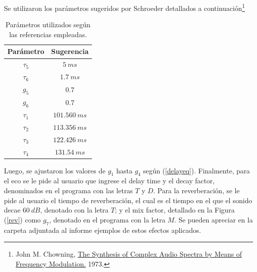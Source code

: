 Se utilizaron los parámetros sugeridos por Schroeder detallados a continuación\footnote{John M. Chowning, \href{https://ccrma.stanford.edu/sites/default/files/user/jc/fm_synthesispaper-2.pdf}{The Synthesis of Complex Audio Spectra by Means of Frequency Modulation.} 1973.}

\begin{table}[H]
\centering
\begin{tabular}{@{}cc@{}}
\toprule
Parámetro & Sugerencia \\ \midrule
$\tau_5$ & $5 \ ms$ \\
$\tau_6$ & $1.7 \ ms$ \\
$g_5$ & $0.7$ \\
$g_6$ & $0.7$ \\
$\tau_1$ & $101.560 \ ms$ \\
$\tau_2$ & $113.356 \ ms$ \\
$\tau_3$ & $122.426 \ ms$ \\
$\tau_4$ & $131.54 \ ms$ \\ \bottomrule
\end{tabular}
\caption{Parámetros utilizados según las referencias empleadas.}
\end{table}

Luego, se ajustaron los valores de $g_1$ hasta $g_4$ según (\ref{delayeq}). Finalmente, para el eco se le pide al usuario que ingrese el delay time y el decay factor, denominados en el programa con las letras $T$ y $D$. Para la reverberación, se le pide al usuario el tiempo de reverberación, el cual es el tiempo en el que el sonido decae $60 \ dB$, denotado con la letra $T$; y el mix factor, detallado en la Figura (\ref{rev}) como $g_7$, denotado en el programa con la letra $M$. Se pueden apreciar en la carpeta adjuntada al informe ejemplos de estos efectos aplicados.